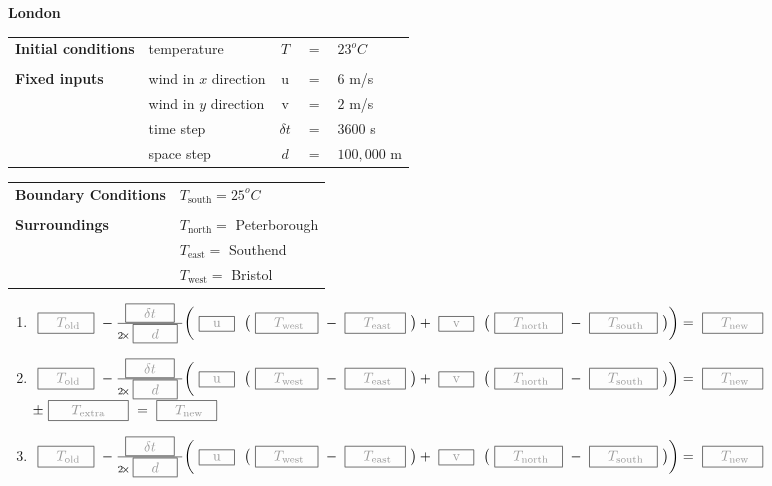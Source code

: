 \begin{slide}{}

\everymath{\displaystyle}
\newcommand{\gbox}[1]{~\boxed{\color{grey} #1}~}
\newcommand{\timeStep}
{
$
\gbox{~~~T_\text{old}~~}
-\frac{\gbox{~~~\delta t~~~}}{2\tims\gbox{~~~d~~~}}
\biggl(\gbox{~~\text{u}~~} ~\bigl( \gbox{~~~T_\text{west}~~}
                          - \gbox{~~~T_\text{east}~~} \bigr)
+      \gbox{~~\text{v}~~} ~\bigl( \gbox{~~~T_\text{north}~~}
                          - \gbox{~~~T_\text{south}~~} \bigr)
\biggr)
= \gbox{~~~T_\text{new}~~}$
}

\newcommand{\workSheet}[6]
{
\begin{center}
{\normalsize\bf #1}

\small
\begin{minipage}[t]{0.5\linewidth}
\begin{tabular}[t]{llccl}
\bf Initial conditions    & temperature  & $T$ & $=$    & $#2^oC$\\ \\
\bf Fixed inputs & wind in $x$ direction & u   & $=$    & $#3$ m/s\\
             & wind in $y$ direction & v   & $=$    & $#4$ m/s\\
             & time step             & $\delta t$ & $=$ & $3600$ s \\
             & space step            & $d$        & $=$ & $100,000$ m
\end{tabular}
\end{minipage}
\begin{minipage}[t]{0.48\linewidth}
\begin{tabular}[t]{ll}
\bf Boundary Conditions & #5 \\ \\
\bf Surroundings        & #6
\end{tabular}
\end{minipage}
\begin{enumerate}\raggedleft
\item \timeStep
\item \timeStep \\$\pm\gbox{~~~~T_\text{extra}~~~~}= \gbox{~~~T_\text{new}~~}$
\item \timeStep
\end{enumerate}
\end{center}
}

\parskip 0pt
\workSheet{London}{23}{6}{2}{$T_\text{south} = 25^oC$}
          {$T_\text{north} = $ Peterborough \\& $T_\text{east} = $ Southend \\&
          $T_\text{west} = $ Bristol}


\end{slide}
